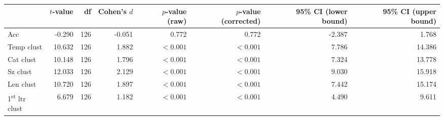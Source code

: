 \begin{tabular}{lrrrrrrr}
\toprule
 & $t$-value & df & Cohen's $d$ & $p$-value (raw) & $p$-value (corrected) & 95\% CI (lower bound) & 95\% CI (upper bound) \\
\midrule
 Acc & -0.290 & 126 & -0.051 & 0.772 & 0.772 & -2.387 & 1.768 \\
\rowcolor[HTML]{fffee3} Temp clust & 10.632 & 126 & 1.882 & $< 0.001$ & $< 0.001$ & 7.786 & 14.386 \\
\rowcolor[HTML]{fffee3} Cat clust & 10.148 & 126 & 1.796 & $< 0.001$ & $< 0.001$ & 7.324 & 13.778 \\
\rowcolor[HTML]{fffee3} Sz clust & 12.033 & 126 & 2.129 & $< 0.001$ & $< 0.001$ & 9.030 & 15.918 \\
\rowcolor[HTML]{fffee3} Len clust & 10.720 & 126 & 1.897 & $< 0.001$ & $< 0.001$ & 7.442 & 15.174 \\
\rowcolor[HTML]{fffee3} 1\textsuperscript{st} ltr clust & 6.679 & 126 & 1.182 & $< 0.001$ & $< 0.001$ & 4.490 & 9.611 \\
\bottomrule
\end{tabular}